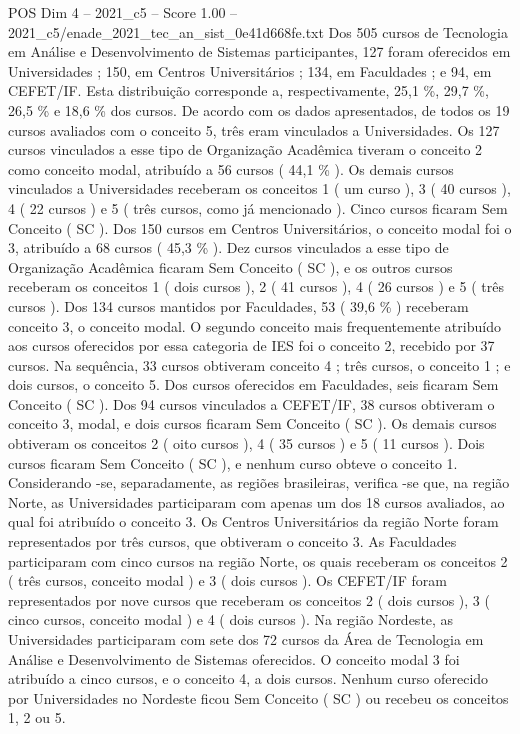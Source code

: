 \begin{textsample}{POS Dim 4 – 2021\_c5 – Score 1.00 – 2021\_c5/enade\_2021\_tec\_an\_sist\_0e41d668fe.txt}
Dos 505 cursos de Tecnologia em Análise e Desenvolvimento de Sistemas participantes, 127 foram oferecidos em Universidades ; 150, em Centros Universitários ; 134, em Faculdades ; e 94, em CEFET/IF.
Esta distribuição corresponde a, respectivamente, 25,1 \%, 29,7 \%, 26,5 \% e 18,6 \% dos cursos.
De acordo com os dados apresentados, de todos os 19 cursos avaliados com o conceito 5, três eram vinculados a Universidades.
Os 127 cursos vinculados a esse tipo de Organização Acadêmica tiveram o conceito 2 como conceito modal, atribuído a 56 cursos ( 44,1 \% ).
Os demais cursos vinculados a Universidades receberam os conceitos 1 ( um curso ), 3 ( 40 cursos ), 4 ( 22 cursos ) e 5 ( três cursos, como já mencionado ).
Cinco cursos ficaram Sem Conceito ( SC ).
Dos 150 cursos em Centros Universitários, o conceito modal foi o 3, atribuído a 68 cursos ( 45,3 \% ).
Dez cursos vinculados a esse tipo de Organização Acadêmica ficaram Sem Conceito ( SC ), e os outros cursos receberam os conceitos 1 ( dois cursos ), 2 ( 41 cursos ), 4 ( 26 cursos ) e 5 ( três cursos ).
Dos 134 cursos mantidos por Faculdades, 53 ( 39,6 \% ) receberam conceito 3, o conceito modal.
O segundo conceito mais frequentemente atribuído aos cursos oferecidos por essa categoria de IES foi o conceito 2, recebido por 37 cursos.
Na sequência, 33 cursos obtiveram conceito 4 ; três cursos, o conceito 1 ; e dois cursos, o conceito 5.
Dos cursos oferecidos em Faculdades, seis ficaram Sem Conceito ( SC ).
Dos 94 cursos vinculados a CEFET/IF, 38 cursos obtiveram o conceito 3, modal, e dois cursos ficaram Sem Conceito ( SC ).
Os demais cursos obtiveram os conceitos 2 ( oito cursos ), 4 ( 35 cursos ) e 5 ( 11 cursos ).
Dois cursos ficaram Sem Conceito ( SC ), e nenhum curso obteve o conceito 1.
Considerando -se, separadamente, as regiões brasileiras, verifica -se que, na região Norte, as Universidades participaram com apenas um dos 18 cursos avaliados, ao qual foi atribuído o conceito 3.
Os Centros Universitários da região Norte foram representados por três cursos, que obtiveram o conceito 3.
As Faculdades participaram com cinco cursos na região Norte, os quais receberam os conceitos 2 ( três cursos, conceito modal ) e 3 ( dois cursos ).
Os CEFET/IF foram representados por nove cursos que receberam os conceitos 2 ( dois cursos ), 3 ( cinco cursos, conceito modal ) e 4 ( dois cursos ).
Na região Nordeste, as Universidades participaram com sete dos 72 cursos da Área de Tecnologia em Análise e Desenvolvimento de Sistemas oferecidos.
O conceito modal 3 foi atribuído a cinco cursos, e o conceito 4, a dois cursos.
Nenhum curso oferecido por Universidades no Nordeste ficou Sem Conceito ( SC ) ou recebeu os conceitos 1, 2 ou 5.

\end{textsample}
